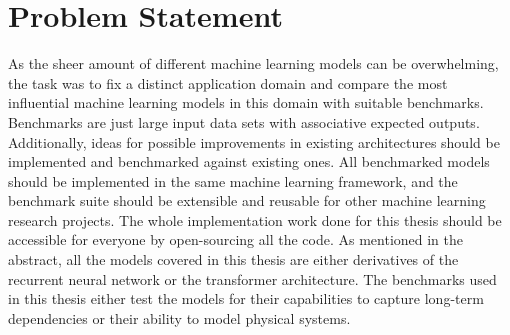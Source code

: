\documentclass[draft,final]{vutinfth} %
\begin{document}
    \section{Problem Statement}
    As the sheer amount of different machine learning models can be overwhelming, the task was to fix a distinct application domain and compare the most influential machine learning models in this domain with suitable benchmarks.
    Benchmarks are just large input data sets with associative expected outputs.
    Additionally, ideas for possible improvements in existing architectures should be implemented and benchmarked against existing ones.
    All benchmarked models should be implemented in the same machine learning framework, and the benchmark suite should be extensible and reusable for other machine learning research projects.
    The whole implementation work done for this thesis should be accessible for everyone by open-sourcing all the code.
    As mentioned in the abstract, all the models covered in this thesis are either derivatives of the recurrent neural network or the transformer \cite{Transformer} architecture.
    The benchmarks used in this thesis either test the models for their capabilities to capture long-term dependencies or their ability to model physical systems.
\end{document}
